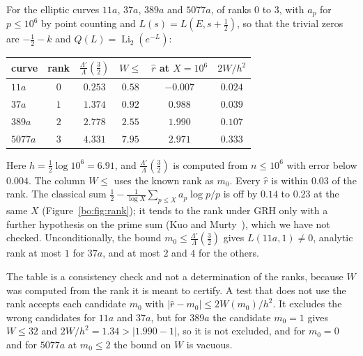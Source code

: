 \begin{remark}[Computation]\label{bo:comp:rank}
For the elliptic curves $11a$, $37a$, $389a$ and $5077a$, of ranks $0$ to $3$, with $a_p$ for $p\le10^6$ by point counting and $L(s)=L(E,s+\frac12)$, so that the trivial zeros are $-\frac12-k$ and $Q(L)=\operatorname{Li}_2(e^{-L})$:
\begin{center}\small
\begin{tabular}{@{}lccccc@{}}
\toprule
curve & rank & $\frac{\Lambda'}{\Lambda}(\frac32)$ & $W\le$ & $\hat r$ at $X=10^6$ & $2W/h^2$\\
\midrule
$11a$ & $0$ & $0.253$ & $0.58$ & $-0.007$ & $0.024$\\
$37a$ & $1$ & $1.374$ & $0.92$ & $0.988$ & $0.039$\\
$389a$ & $2$ & $2.778$ & $2.55$ & $1.990$ & $0.107$\\
$5077a$ & $3$ & $4.331$ & $7.95$ & $2.971$ & $0.333$\\
\bottomrule
\end{tabular}
\end{center}
Here $h=\frac12\log10^6=6.91$, and $\frac{\Lambda'}{\Lambda}(\frac32)$ is computed from $n\le10^6$ with error below $0.004$. The column $W\le$ uses the known rank as $m_0$. Every $\hat r$ is within $0.03$ of the rank. The classical sum $\frac12-\frac1{\log X}\sum_{p\le X}a_p\log p/p$ is off by $0.14$ to $0.23$ at the same $X$ (Figure~\ref{bo:fig:rank}); it tends to the rank under GRH only with a further hypothesis on the prime sum (Kuo and Murty~\cite{KuoMurty05}), which we have not checked. %
Unconditionally, the bound $m_0\le\frac{\Lambda'}{\Lambda}(\frac32)$ gives $L(11a,1)\ne0$, analytic rank at most $1$ for $37a$, and at most $2$ and $4$ for the others.
\end{remark}

The table is a consistency check and not a determination of the ranks, because $W$ was computed from the rank it is meant to certify. A test that does not use the rank accepts each candidate $m_0$ with $|\hat r-m_0|\le2W(m_0)/h^2$. It excludes the wrong candidates for $11a$ and $37a$, but for $389a$ the candidate $m_0=1$ gives $W\le32$ and $2W/h^2=1.34>|1.990-1|$, so it is not excluded, and for $m_0=0$ and for $5077a$ at $m_0\le2$ the bound on $W$ is vacuous. %

